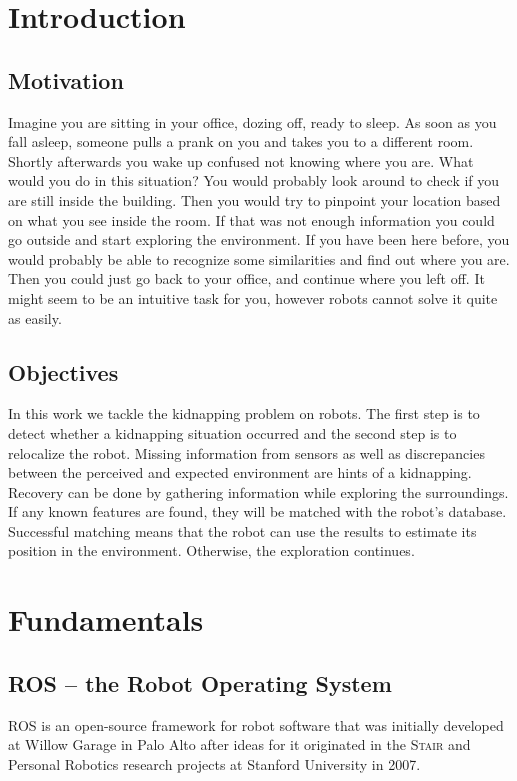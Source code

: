 \chapter{Introduction}
\section{Motivation}

Imagine you are sitting in your office, dozing off, ready to sleep. As soon as you fall asleep, someone pulls a prank on you and takes you to a different room. Shortly afterwards you wake up confused not knowing where you are. What would you do in this situation? You would probably look around to check if you are still inside the building. Then you would try to pinpoint your location based on what you see inside the room. If that was not enough information you could go outside and start exploring the environment. If you have been here before, you would probably be able to recognize some similarities and find out where you are. Then you could just go back to your office, and continue where you left off. It might seem to be an intuitive task for you, however robots cannot solve it quite as easily.

\section{Objectives}

In this work we tackle the kidnapping problem on robots. The first step is to detect whether a kidnapping situation occurred and the second step is to relocalize the robot. Missing information from sensors as well as discrepancies between the perceived and expected environment are hints of a kidnapping. Recovery can be done by gathering information while exploring the surroundings. If any known features are found, they will be matched with the robot's database. Successful matching means that the robot can use the results to estimate its position in the environment. Otherwise, the exploration continues.

\chapter{Fundamentals}
\section{ROS -- the Robot Operating System}
ROS is an open-source framework for robot software that was initially developed at Willow Garage in Palo Alto after ideas for it originated in the \textsc{Stair} and Personal Robotics research projects at Stanford University in 2007. 

